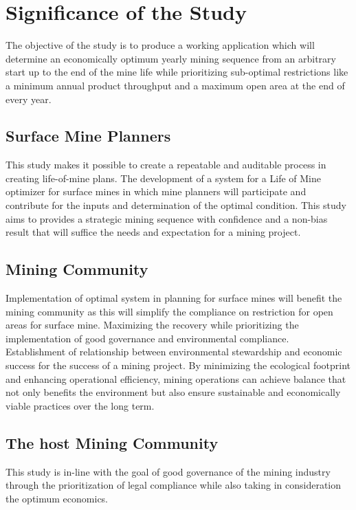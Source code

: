 \documentclass[12pt]{report}
\begin{document}
\section{Significance of the Study}

The objective of the study is to produce a working application which will determine an economically optimum yearly mining sequence from an arbitrary start up to the end of the mine life while prioritizing sub-optimal restrictions like a minimum annual product throughput and a maximum open area at the end of every year.


\subsection{Surface Mine Planners}

This study makes it possible to create a repeatable and auditable process in creating life-of-mine plans.
The development of a system for a Life of Mine optimizer for surface mines in which mine planners will participate and contribute for the inputs and determination of the optimal condition.
This study aims to provides a strategic mining sequence with confidence and a non-bias result that will suffice the needs and expectation for a mining project.

\subsection{Mining Community}

Implementation of optimal system in planning for surface mines will benefit the mining community as this will simplify the compliance on restriction for open areas for surface mine.
Maximizing the recovery while prioritizing the implementation of good governance and environmental compliance.
Establishment of relationship between environmental stewardship and economic success for the success of a mining project.
By minimizing the ecological footprint and enhancing operational efficiency, mining operations can achieve balance that not only benefits the environment but also ensure sustainable and economically viable practices over the long term.

\subsection{The host Mining Community}

This study is in-line with the goal of good governance of the mining industry through the prioritization of legal compliance while also taking in consideration the optimum economics.
\end{document}
